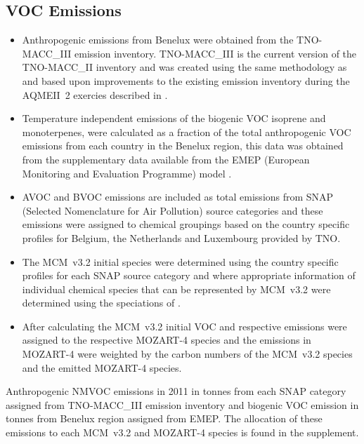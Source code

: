 \subsection{VOC Emissions} \label{ss:VOC_emissions}
\begin{itemize}
    \item Anthropogenic emissions from Benelux were obtained from the TNO-MACC\_III emission inventory. TNO-MACC\_III is the current version of the TNO-MACC\_II inventory and was created using the same methodology as \citep{Kuenen:2014} and based upon improvements to the existing emission inventory during the AQMEII~2 exercies described in \citet{Pouliot:2015}. 
    \item Temperature independent emissions of the biogenic VOC isoprene and monoterpenes, were calculated as a fraction of the total anthropogenic VOC emissions from each country in the Benelux region, this data was obtained from the supplementary data available from the EMEP (European Monitoring and Evaluation Programme) model \citep{Simpson:2012}.
    \item AVOC and BVOC emissions are included as total emissions from SNAP (Selected Nomenclature for Air Pollution) source categories and these emissions were assigned to chemical groupings based on the country specific profiles for Belgium, the Netherlands and Luxembourg provided by TNO.
    \item The MCM~v3.2 initial species were determined using the country specific profiles for each SNAP source category and where appropriate information of individual chemical species that can be represented by MCM~v3.2 were determined using the speciations of \citet{Passant:2002}. %
    \item After calculating the MCM~v3.2 initial VOC and respective emissions were assigned to the respective MOZART-4 species and the emissions in MOZART-4 were weighted by the carbon numbers of the MCM~v3.2 species and the emitted MOZART-4 species.
\end{itemize}
{%
    \renewcommand{\arraystretch}{1.1}%
    \begin{table}%
        \centering%
        \caption{Anthropogenic NMVOC emissions in 2011 in tonnes from each SNAP category assigned from TNO-MACC\_III emission inventory and biogenic VOC emission in tonnes from Benelux region assigned from EMEP. The allocation of these emissions to each MCM~v3.2 and MOZART-4 species is found in the supplement.}%
        
        \vspace{-2mm}%
        \label{t:NMVOC_emissions}%
    \end{table}%
}

